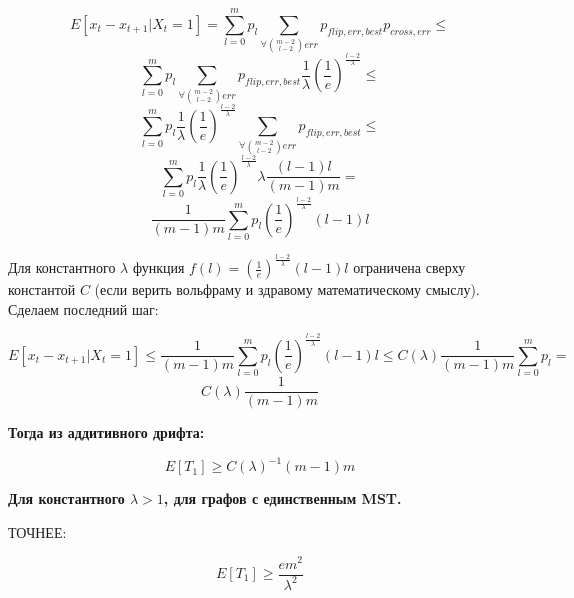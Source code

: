 \documentclass{article}
\begin{document}
$$
E[x_t - x_{t+1} | X_t = 1] = \sum_{l=0}^{m} p_l \sum_{\forall \binom{m - 2}{l - 2} err} p_{flip, err, best} p_{cross, err} \leq
$$
$$
\sum_{l=0}^{m} p_l \sum_{\forall \binom{m - 2}{l - 2} err} p_{flip, err, best} \frac{1}{\lambda}(\frac{1}{e})^\frac{l - 2}{\lambda} \leq
$$
$$
\sum_{l=0}^{m} p_l \frac{1}{\lambda}(\frac{1}{e})^\frac{l - 2}{\lambda} \sum_{\forall \binom{m - 2}{l - 2} err} p_{flip, err, best} \leq
$$
$$
\sum_{l=0}^{m} p_l \frac{1}{\lambda}(\frac{1}{e})^\frac{l - 2}{\lambda} \lambda\frac{(l - 1)l}{(m - 1)m} =
$$
$$
\frac{1}{(m - 1)m}\sum_{l=0}^{m} p_l (\frac{1}{e})^\frac{l - 2}{\lambda} (l - 1)l
$$

Для константного $\lambda$ функция $f(l) = (\frac{1}{e})^\frac{l - 2}{\lambda} (l - 1)l$ ограничена сверху константой $C$ (если верить вольфраму и здравому математическому смыслу). Сделаем последний шаг:

$$
E[x_t - x_{t+1} | X_t = 1] \leq \frac{1}{(m - 1)m}\sum_{l=0}^{m} p_l (\frac{1}{e})^\frac{l - 2}{\lambda} (l - 1)l \leq
C(\lambda) \frac{1}{(m - 1)m}\sum_{l=0}^{m} p_l = 
$$
$$
C(\lambda) \frac{1}{(m - 1)m}
$$

\textbf{Тогда из аддитивного дрифта:}

$$
E[T_1] \geq C(\lambda)^{-1} (m - 1)m
$$

\textbf{Для константного  $\lambda > 1$, для графов с единственным MST.}

ТОЧНЕЕ:

$$
E[T_1] \geq \frac{e m^2}{\lambda^2}
$$
\end{document}
